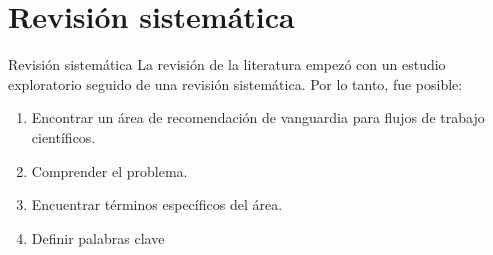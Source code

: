 \section{Revisión sistemática}

\begin{frame}		
	\begin{block}{Revisión sistemática}
		La revisión de la literatura empezó con un estudio exploratorio seguido de una revisión sistemática. Por lo tanto, fue posible:
		\begin{enumerate}
			\item Encontrar un área de recomendación de vanguardia para flujos de trabajo científicos.
			\item Comprender el problema.
			\item Encuentrar términos específicos del área.
			\item Definir palabras clave
		\end{enumerate}
	\end{block}
\end{frame}

